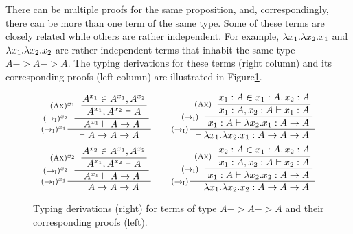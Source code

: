 There can be multiple proofs for the same proposition, and,
correspondingly, there can be more than one term of the same type.
Some of these terms are closely related while others are rather independent.
For example, $\lambda x_1.\lambda x_2.x_1$ and $\lambda x_1.\lambda x_2.x_2$ are rather 
independent terms that inhabit the same type $A -> A -> A$.
The typing derivations for these terms (right column) and
its corresponding proofs (left column) are illustrated in
Figure\;\ref{fig:proofAAA}.
\begin{figure}
\[\setpremisesend{.1em}
\inference[$(->_\textsc{I})^{x_1}$]
        {\hspace*{-3em}
         \inference[$(->_\textsc{I})^{x_2}$]
                {\hspace*{-3em}
                 \inference[$(\textsc{Ax})^{x_1}$]
                        {A^{x_1}\in A^{x_1},A^{x_2}}
                        {A^{x_1},A^{x_2} |- A} }
                {A^{x_1} |- A -> A} }
        {|- A -> A -> A }
\qquad
\inference[($->_\textsc{I}$)]
        {\hspace*{-1.3em}
         \inference[($->_\textsc{I}$)]
                {\hspace*{-1.5em}
                 \inference[(\textsc{Ax})]
                        {x_1 : A \in x_1 : A, x_2 : A}
                        {x_1 : A, x_2 : A |- x_1 : A} }
                {x_1 : A |- \l x_2.x_1 : A -> A} }
        {|- \l x_1.\l x_2.x_1 : A -> A -> A }
\]
\[\setpremisesend{.1em}
\inference[$(->_\textsc{I})^{x_1}$]
        {\hspace*{-3em}
         \inference[$(->_\textsc{I})^{x_2}$]
                {\hspace*{-3em}
                 \inference[$(\textsc{Ax})^{x_2}$]
                        {A^{x_2}\in A^{x_1},A^{x_2}}
                        {A^{x_1},A^{x_2} |- A} }
                {A^{x_1} |- A -> A} }
        {|- A -> A -> A }
\qquad
\inference[($->_\textsc{I}$)]
        {\hspace*{-1.3em}
         \inference[($->_\textsc{I}$)]
                {\hspace*{-1.5em}
                 \inference[(\textsc{Ax})]
                        {x_2 : A \in x_1 : A, x_2 : A}
                        {x_1 : A, x_2 : A |- x_2 : A} }
                {x_1 : A |- \l x_2.x_2 : A -> A} }
        {|- \l x_1.\l x_2.x_2 : A -> A -> A }
\]
\caption{Typing derivations (right) for terms of type $A -> A -> A$
        and their corresponding proofs (left).}
\label{fig:proofAAA}
\end{figure}

